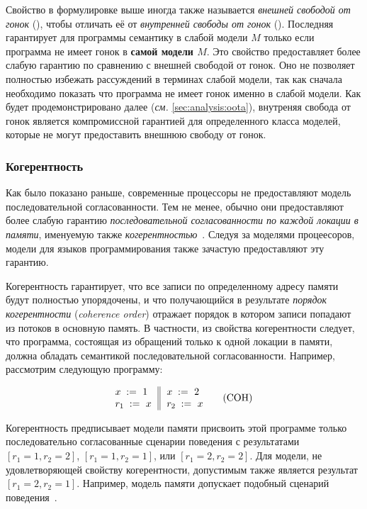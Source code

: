 Свойство \DRF в формулировке выше иногда также называется
\emph{внешней свободой от гонок} (\eDRF), 
чтобы отличать её от \emph{внутренней свободы от гонок} (\iDRF).
Последняя гарантирует для программы семантику \SC
в слабой модели $M$ только если программа 
не имеет гонок в \textbf{самой модели $M$}.
Это свойство предоставляет более слабую гарантию
по сравнению с внешней свободой от гонок. 
Оно не позволяет полностью избежать рассуждений 
в терминах слабой модели, так как 
сначала необходимо показать что программа не имеет 
гонок именно в слабой модели. 
Как будет продемонстрировано далее (\emph{см.} \cref{sec:analysis:oota}), 
внутреняя свобода от гонок является компромиссной гарантией 
для определенного класса моделей, которые не могут 
предоставить внешнюю свободу от гонок. 

\subsubsection{Когерентность}
\label{sec:background:coh}

Как было показано раньше, современные процессоры
не предоставляют модель последовательной согласованности. 
Тем не менее, обычно они предоставляют более слабую 
гарантию \emph{последовательной согласованности 
по каждой локации в памяти}, именуемую также 
\emph{когерентностью}~\cite{Alglave-al:TOPLAS14}. 
Следуя за моделями процеесоров, модели 
для языков программирования также зачастую предоставляют эту гарантию.

Когерентность гарантирует, что все записи 
по определенному адресу памяти будут полностью упорядочены,
и что получающийся в результате \emph{порядок когерентности} 
(\emph{coherence order}) отражает порядок 
в котором записи попадают из потоков в основную память.
В частности, из свойства когерентности следует, 
что программа, состоящая из обращений только 
к одной локации в памяти, должна 
обладать семантикой последовательной согласованности.
Например, рассмотрим следующую программу:

\begin{equation*}
\inarrII{
   \writeInst{}{x}{1}   \\
   \readInst{}{r_1}{x}  \\
}{
   \writeInst{}{x}{2}   \\
   \readInst{}{r_2}{x}  \\
}
\tag{COH}\label{ex:coh}
\end{equation*}

Когерентность предписывает модели памяти 
присвоить этой программе только последовательно 
согласованные сценарии поведения с результатами
${[r_1=1, r_2=2]}$, ${[r_1=1, r_2=1]}$, или ${[r_1=2, r_2=2]}$.
Для модели, не удовлетворяющей свойству когерентности, 
допустимым также является результат ${[r_1=2, r_2=1]}$.
Например, модель памяти \Java допускает подобный сценарий поведения~\cite{Manson-al:POPL05}.

